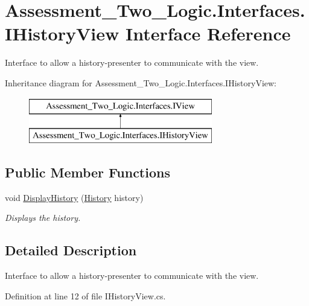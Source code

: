 \hypertarget{interface_assessment___two___logic_1_1_interfaces_1_1_i_history_view}{
\section{Assessment\_\-Two\_\-Logic.Interfaces.IHistoryView Interface Reference}
\label{interface_assessment___two___logic_1_1_interfaces_1_1_i_history_view}
}


Interface to allow a history-\/presenter to communicate with the view.  


Inheritance diagram for Assessment\_\-Two\_\-Logic.Interfaces.IHistoryView:\begin{figure}[H]
\begin{center}
\leavevmode
\includegraphics[height=2.000000cm]{interface_assessment___two___logic_1_1_interfaces_1_1_i_history_view}
\end{center}
\end{figure}
\subsection*{Public Member Functions}
\begin{DoxyCompactItemize}
\item 
void \hyperlink{interface_assessment___two___logic_1_1_interfaces_1_1_i_history_view_a0035e64a313631725e0b239a912267d0}{DisplayHistory} (\hyperlink{class_assessment___two___logic_1_1_model_1_1_history}{History} history)
\begin{DoxyCompactList}\small\item\em Displays the history. \item\end{DoxyCompactList}\end{DoxyCompactItemize}


\subsection{Detailed Description}
Interface to allow a history-\/presenter to communicate with the view. 

Definition at line 12 of file IHistoryView.cs.



